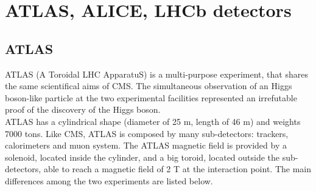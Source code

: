 




\section{ATLAS, ALICE, LHCb detectors}

\subsection{ATLAS}
ATLAS (A Toroidal LHC ApparatuS) is a multi-purpose experiment, that shares the same scientifical aims of CMS. The simultaneous observation of an Higgs boson-like particle at the two experimental facilities represented an irrefutable proof of the discovery of the Higgs boson.\\
ATLAS has a cylindrical shape (diameter of 25 m, length of 46 m) and weights 7000 tons. Like CMS, ATLAS is composed by many sub-detectors: trackers, calorimeters and muon system. The ATLAS magnetic field is provided by a solenoid, located inside the cylinder, and a big toroid, located outside the sub-detectors, able to reach a magnetic field of 2 T at the interaction point. The main differences among the two experiments are listed below.

